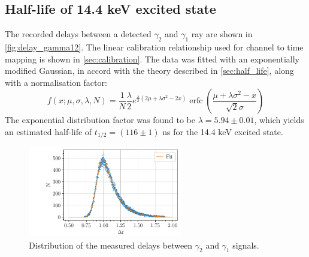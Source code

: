 \subsection{Half-life of 14.4 keV excited state}

The recorded delays between a detected \(\gamma_2\) and \(\gamma_1\) ray are shown in \autoref{fig:delay_gamma12}. The linear calibration relationship used for channel to time mapping is shown in \autoref{sec:calibration}. The data was fitted with an exponentially modified Gaussian, in accord with the theory described in \autoref{sec:half_life}, along with a normalisation factor:
\begin{equation}
    f(x;\mu,\sigma,\lambda, N) = \frac{1}{N} \frac{\lambda}{2} e^{\frac{\lambda}{2} (2 \mu + \lambda \sigma^2 - 2 x)}
             \operatorname{erfc} \left(\frac{\mu + \lambda \sigma^2 - x}{ \sqrt{2} \sigma}\right)
\end{equation}
The exponential distribution factor was found to be \(\lambda = 5.94 \pm 0.01\), which yields an estimated half-life of \(t_{1/2} = (116 \pm 1)\) ns for the 14.4 keV excited state.

\begin{figure}[h]
    \centering
    \includegraphics[width=0.6\textwidth]{figures/co57_halflife.pdf}    
    \caption{Distribution of the measured delays between \(\gamma_2\) and \(\gamma_1\) signals.}
    \label{fig:delay_gamma12}
\end{figure}

